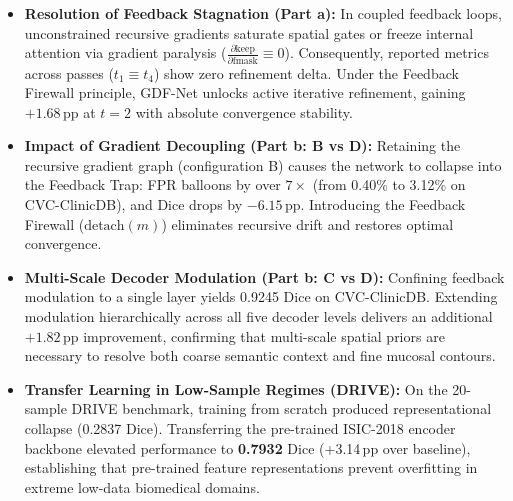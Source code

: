 \begin{itemize}
  \item \textbf{Resolution of Feedback Stagnation (Part a):} In coupled feedback loops, unconstrained recursive gradients saturate spatial gates or freeze internal attention via gradient paralysis ($\frac{\partial \text{keep}}{\partial \text{fmask}} \equiv 0$). Consequently, reported metrics across passes ($t_1 \equiv t_4$) show zero refinement delta. Under the Feedback Firewall principle, GDF-Net unlocks active iterative refinement, gaining $+1.68$\,pp at $t=2$ with absolute convergence stability.
  \item \textbf{Impact of Gradient Decoupling (Part b: B vs D):} Retaining the recursive gradient graph (configuration B) causes the network to collapse into the Feedback Trap: FPR balloons by over $7\times$ (from 0.40\% to 3.12\% on CVC-ClinicDB), and Dice drops by $-6.15$\,pp. Introducing the Feedback Firewall ($\text{detach}(m)$) eliminates recursive drift and restores optimal convergence.
  \item \textbf{Multi-Scale Decoder Modulation (Part b: C vs D):} Confining feedback modulation to a single layer yields 0.9245 Dice on CVC-ClinicDB. Extending modulation hierarchically across all five decoder levels delivers an additional $+1.82$\,pp improvement, confirming that multi-scale spatial priors are necessary to resolve both coarse semantic context and fine mucosal contours.
  \item \textbf{Transfer Learning in Low-Sample Regimes (DRIVE):} On the 20-sample DRIVE benchmark, training from scratch produced representational collapse (0.2837 Dice). Transferring the pre-trained ISIC-2018 encoder backbone elevated performance to \textbf{0.7932} Dice (+3.14\,pp over baseline), establishing that pre-trained feature representations prevent overfitting in extreme low-data biomedical domains.
\end{itemize}
